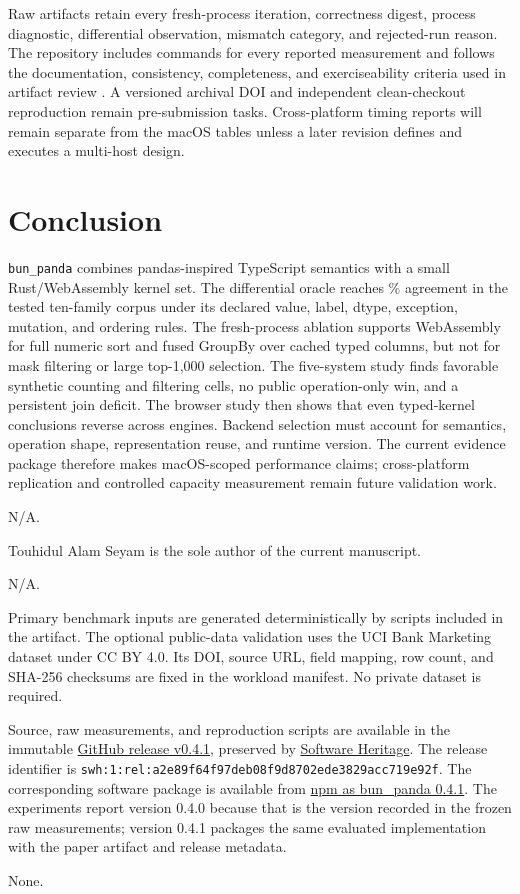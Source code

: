 \documentclass[pdflatex,sn-basic,Numbered]{sn-jnl}
\begin{document}
Raw artifacts retain every fresh-process iteration, correctness digest, process diagnostic, differential observation, mismatch category, and rejected-run reason. The repository includes commands for every reported measurement and follows the documentation, consistency, completeness, and exerciseability criteria used in artifact review \cite{acmartifact}. A versioned archival DOI and independent clean-checkout reproduction remain pre-submission tasks. Cross-platform timing reports will remain separate from the macOS tables unless a later revision defines and executes a multi-host design.

\section{Conclusion}\label{sec:conclusion}

\texttt{bun\_panda} combines pandas-inspired TypeScript semantics with a small Rust/WebAssembly kernel set. The differential oracle reaches \ConformancePercent{}\% agreement in the tested ten-family corpus under its declared value, label, dtype, exception, mutation, and ordering rules. The fresh-process ablation supports WebAssembly for full numeric sort and fused GroupBy over cached typed columns, but not for mask filtering or large top-1,000 selection. The five-system study finds favorable synthetic counting and filtering cells, no public operation-only win, and a persistent join deficit. The browser study then shows that even typed-kernel conclusions reverse across engines. Backend selection must account for semantics, operation shape, representation reuse, and runtime version. The current evidence package therefore makes macOS-scoped performance claims; cross-platform replication and controlled capacity measurement remain future validation work.

\backmatter

N/A.

Touhidul Alam Seyam is the sole author of the current manuscript.

N/A.

Primary benchmark inputs are generated deterministically by scripts included in the artifact. The optional public-data validation uses the UCI Bank Marketing dataset under CC BY 4.0. Its DOI, source URL, field mapping, row count, and SHA-256 checksums are fixed in the workload manifest. No private dataset is required.

Source, raw measurements, and reproduction scripts are available in the immutable \href{https://github.com/Seyamalam/bun_panda/releases/tag/v0.4.1}{GitHub release v0.4.1}, preserved by \href{https://archive.softwareheritage.org/swh:1:rel:a2e89f64f97deb08f9d8702ede3829acc719e92f}{Software Heritage}. The release identifier is \nolinkurl{swh:1:rel:a2e89f64f97deb08f9d8702ede3829acc719e92f}. The corresponding software package is available from \href{https://www.npmjs.com/package/bun_panda/v/0.4.1}{npm as bun\_panda 0.4.1}. The experiments report version 0.4.0 because that is the version recorded in the frozen raw measurements; version 0.4.1 packages the same evaluated implementation with the paper artifact and release metadata.

None.

\renewcommand{\bibfont}{\small}
\setlength{\bibsep}{0.5em}

\end{document}
